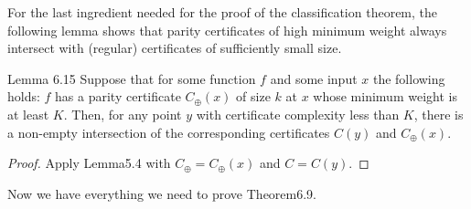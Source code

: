 For the last ingredient needed for the proof of the classification theorem, the following lemma shows that parity certificates of high minimum weight always intersect with (regular) certificates of sufficiently small size.
\begin{originalresult}{Lemma 6.15}
Suppose that for some function $f$ and some input $x$ the following holds: $f$ has a parity certificate $C_\oplus(x)$ of size $k$ at $x$ whose minimum weight is at least $K$. Then, for any point $y$ with certificate complexity less than $K$, there is a non-empty intersection of the corresponding certificates $C(y)$ and $C_\oplus(x)$.
\end{originalresult}
\begin{proof}
Apply Lemma5.4 with $C_\oplus=C_\oplus(x)$ and $C=C(y)$.
\end{proof}
Now we have everything we need to prove Theorem6.9.
